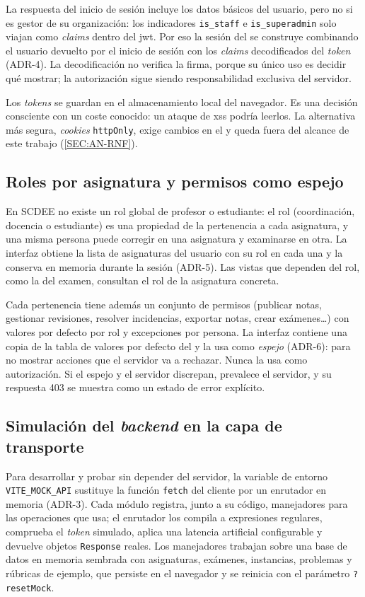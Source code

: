 La respuesta del inicio de sesión incluye los datos básicos del usuario, pero no si es
gestor de su organización: los indicadores \texttt{is\_staff} e \texttt{is\_superadmin}
solo viajan como \textit{claims} dentro del \acs{jwt}. Por eso la sesión del
 se construye combinando el usuario devuelto por el inicio de sesión con los
\textit{claims} decodificados del \textit{token} (ADR-4). La decodificación no verifica la
firma, porque su único uso es decidir qué mostrar; la autorización sigue siendo
responsabilidad exclusiva del servidor.

Los \textit{tokens} se guardan en el almacenamiento local del navegador. Es una decisión
consciente con un coste conocido: un ataque de \acs{xss} podría leerlos. La alternativa más
segura, \textit{cookies} \texttt{httpOnly}, exige cambios en el  y queda
fuera del alcance de este trabajo (\cref{SEC:AN-RNF}).

\subsection{Roles por asignatura y permisos como espejo}

En SCDEE no existe un rol global de profesor o estudiante: el rol (coordinación, docencia o
estudiante) es una propiedad de la pertenencia a cada asignatura, y una misma persona puede
corregir en una asignatura y examinarse en otra. La interfaz obtiene la lista de
asignaturas del usuario con su rol en cada una y la conserva en memoria durante la sesión
(ADR-5). Las vistas que dependen del rol, como la del examen, consultan el rol de la
asignatura concreta.

Cada pertenencia tiene además un conjunto de permisos (publicar notas, gestionar
revisiones, resolver incidencias, exportar notas, crear exámenes\ldots) con valores por
defecto por rol y excepciones por persona. La interfaz contiene una copia de la tabla de
valores por defecto del  y la usa como \emph{espejo} (ADR-6): para no mostrar
acciones que el servidor va a rechazar. Nunca la usa como autorización. Si el espejo y el
servidor discrepan, prevalece el servidor, y su respuesta 403 se muestra como un estado de
error explícito.

\subsection{Simulación del \textit{backend} en la capa de transporte}

Para desarrollar y probar sin depender del servidor, la variable de entorno
\texttt{VITE\_MOCK\_API} sustituye la función \texttt{fetch} del cliente por un enrutador
en memoria (ADR-3). Cada módulo registra, junto a su código, manejadores para las
operaciones que usa; el enrutador los compila a expresiones regulares, comprueba el
\textit{token} simulado, aplica una latencia artificial configurable y devuelve objetos
\texttt{Response} reales. Los manejadores trabajan sobre una base de datos en memoria
sembrada con asignaturas, exámenes, instancias, problemas y rúbricas de ejemplo, que
persiste en el navegador y se reinicia con el parámetro \texttt{?resetMock}.

